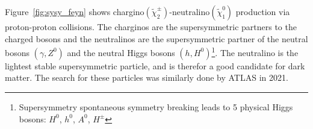 Figure \ref{fig:sysy_feyn} shows chargino$(\tilde{\chi}_2^{\pm})$-neutralino$(\tilde{\chi}_1^{0})$ production via proton-proton collisions. 
The charginos are the supersymmetric partners 
to the charged bosons and the neutralinos are the supersymmetric partner of the neutral bosons $(\gamma, Z^0)$ and 
the neutral Higgs bosons $(h, H^0)$\footnote{Supersymmetry spontaneous symmetry breaking leads to 5 physical Higgs bosons: 
$H^0$, $h^0$, $A^0$, $H^{\pm}$}. The neutralino
is the lightest stable supersymmetric particle, and is therefor a good candidate for dark matter. 
The search for these particles was similarly done by ATLAS in 2021\cite{atlas_search_2021}. 